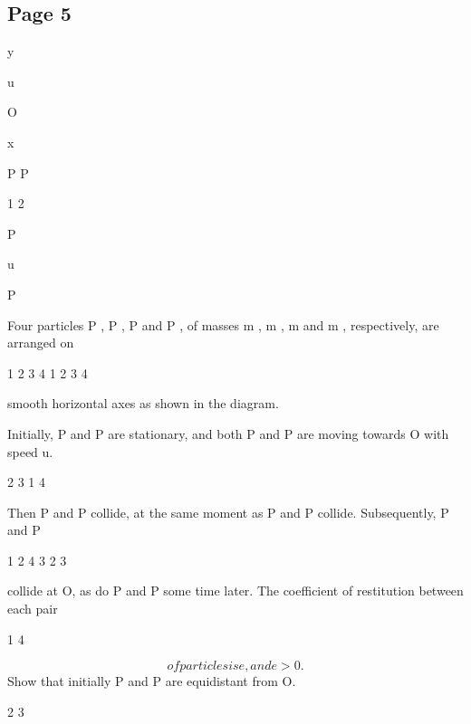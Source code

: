 \documentclass[12pt]{article}
\begin{document}
\subsection*{Page 5}
\begin{flushleft}
y\par
u\par
O\par
x\par
P P\par
1 2\par
P\par
u\par
P\par
Four particles P , P , P and P , of masses m , m , m and m , respectively, are arranged on\par
1 2 3 4 1 2 3 4\par
smooth horizontal axes as shown in the diagram.\par
Initially, P and P are stationary, and both P and P are moving towards O with speed u.\par
2 3 1 4\par
Then P and P collide, at the same moment as P and P collide. Subsequently, P and P\par
1 2 4 3 2 3\par
collide at O, as do P and P some time later. The coefficient of restitution between each pair\par
1 4\par
\[of particles is e, and e > 0.\]
Show that initially P and P are equidistant from O.\par
2 3\par
\end{flushleft}
\end{document}
